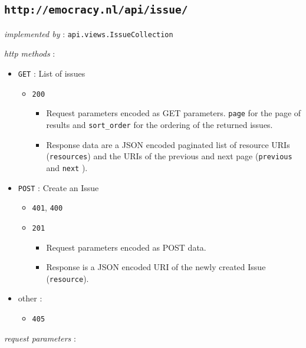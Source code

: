 \documentclass[a4paper]{report}
\begin{document}
\subsection{\texttt{http://emocracy.nl/api/issue/}}
\begin{itemize}
    \item{\textsl{implemented by} : \texttt{api.views.IssueCollection}}
    \item{\textsl{http methods} :
        \begin{itemize}
            \item{\texttt{GET} : List of issues 
                \begin{itemize}
                    \item{\texttt{200}
                    \begin{itemize}
                        \item{Request parameters encoded as GET parameters. 
                        \texttt{page} for the page of results and \texttt{sort\_order}
                        for the ordering of the returned issues.}
                        \item{Response data are a JSON encoded paginated list of 
                        resource URIs (\texttt{resources}) and the URIs of the 
                        previous and next page (\texttt{previous} and \texttt{next}
                        ).}
                    \end{itemize}
                    }
                \end{itemize}
             }
            \item{\texttt{POST} : Create an Issue
                \begin{itemize}
                    \item{\texttt{401}, \texttt{400}}
                    \item{\texttt{201}
                    \begin{itemize}
                        \item{Request parameters encoded as POST data.}
                        \item{Response is a JSON encoded URI of the newly
                        created Issue (\texttt{resource}).}
                    \end{itemize}
                    }
                \end{itemize}
            }
            \item{other : 
                \begin{itemize}
                    \item{\texttt{405}}
                \end{itemize}
            }
        \end{itemize}
    \item{\textsl{request parameters} : }
    }
\end{itemize}
\end{document}

